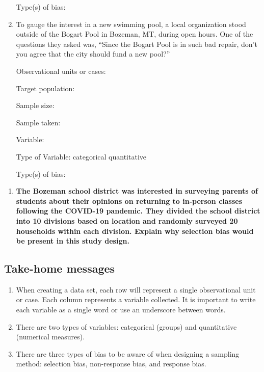 \documentclass[
]{report}
\providecommand{\tightlist}{%
  \setlength{\itemsep}{0pt}\setlength{\parskip}{0pt}}
\begin{document}
\begin{enumerate}
  Type(s) of bias:
  \vspace{0.3in}
\item
  To gauge the interest in a new swimming pool, a local organization stood outside of the Bogart Pool in Bozeman, MT, during open hours. One of the questions they asked was, ``Since the Bogart Pool is in such bad repair, don't you agree that the city should fund a new pool?''
  \vspace{0.1in}

  Observational units or cases:
  \vspace{0.3in}

  Target population:
  \vspace{0.3in}

  Sample size:
  \vspace{0.3in}

  Sample taken:
  \vspace{0.3in}

  Variable:
  \vspace{0.3in}

  Type of Variable: \hspace{1mm} categorical \hspace{0.2in} quantitative
  \vspace{1mm}

  Type(s) of bias:
  \vspace{0.3in}
\end{enumerate}

\newpage

\begin{enumerate}
\def\labelenumi{\arabic{enumi}.}
\setcounter{enumi}{6}
\tightlist
\item
  \textbf{The Bozeman school district was interested in surveying parents of students about their opinions on returning to in-person classes following the COVID-19 pandemic. They divided the school district into 10 divisions based on location and randomly surveyed 20 households within each division. Explain why selection bias would be present in this study design.}
  \vspace{1in}
\end{enumerate}

\hypertarget{take-home-messages}{%
\subsection{Take-home messages}\label{take-home-messages}}

\begin{enumerate}
\def\labelenumi{\arabic{enumi}.}
\item
  When creating a data set, each row will represent a single observational unit or case. Each column represents a variable collected. It is important to write each variable as a single word or use an underscore between words.
\item
  There are two types of variables: categorical (groups) and quantitative (numerical measures).
\item
  There are three types of bias to be aware of when designing a sampling method: selection bias, non-response bias, and response bias.
\end{enumerate}
\end{document}
